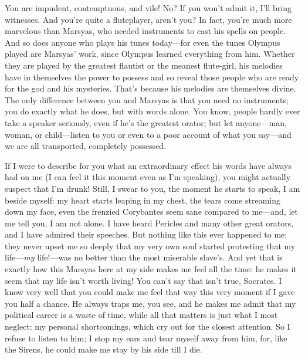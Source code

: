 You are impudent, contemptuous, and vile! No? If you won't admit it,
I'll bring witnesses. And you're quite a fluteplayer, aren't you? In
fact, you're much more marvelous than Marsyas, who needed instruments to
 cast his spells on people. And so does anyone who plays his
tunes today---for even the tunes
Olympus played are
Marsyas' work, since Olympus learned everything from him. Whether they
are played by the greatest flautist or the meanest flute-girl, his
melodies have in themselves the power to possess and so reveal those
people who are ready for the god and his mysteries. That's because his
melodies are themselves divine. The only difference between you and
Marsyas is that you need no instruments; you do exactly what he does,
but with words alone. You know, people hardly  ever take a
speaker seriously, even if he's the greatest orator; but let
anyone---man, woman, or child---listen to you or even to a poor account
of what you say---and we are all transported, completely possessed.

If I were to describe for you what an extraordinary effect his words
have always had on me (I can feel it this moment even as I'm speaking),
 you might actually suspect that I'm drunk! Still, I swear to
you, the moment he starts to speak, I am beside myself: my heart starts
leaping in my chest, the tears come streaming down my face, even the
frenzied Corybantes
seem sane compared to me---and, let me tell you, I am not alone. I have
heard Pericles and many other great orators, and I have admired their
speeches. But nothing like this ever happened to me: they never upset me
so deeply that my very own soul started protesting that my
life---{\em my} life!---was no better than the most miserable slave's.
And yet that is exactly how  this Marsyas here at my side
makes me feel all the time: he makes it seem that my life isn't worth
living! You can't say that isn't true, Socrates. I know very well that
you could make me feel that way this very moment if I gave you half a
chance. He always traps me, you see, and he makes me admit that my
political career is a waste of time, while all that matters is just what
I most neglect: my personal shortcomings, which cry out for the closest
attention. So I refuse to listen to him; I stop my ears and tear 
myself away from him, for, like the Sirens, he could make me stay by his
side till I die.


